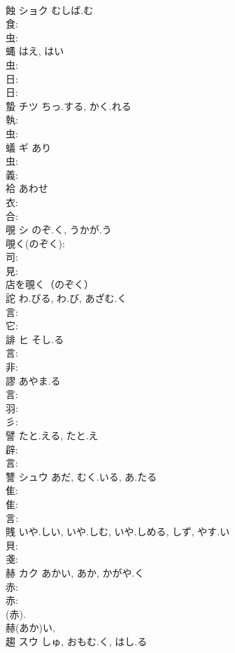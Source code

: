 \documentclass[8pt]{extreport}
\begin{document}
\begin{CJK}{UTF8}{min}
\\	蝕	ショク	むしば.む		
\\	食: 
\\	虫: 
\\	蝿		はえ, はい				
\\	虫: 
\\	日: 
\\	日: 
\\	蟄	チツ	ちっ.する, かく.れる		
\\	執: 
\\	虫: 
\\	蟻	ギ	あり		
\\	虫: 
\\	義: 
\\	袷		あわせ				
\\	衣: 
\\	合: 
\\	覗	シ	のぞ.く, うかが.う		
\\	覗く(のぞく): 
\\	司: 
\\	見: 
\\	店を覗く（のぞく） 
\\	詑		わ.びる, わ.び, あざむ.く				
\\	言: 
\\	它: 
\\	誹	ヒ	そし.る		
\\	言: 
\\	非: 
\\	謬		あやま.る				
\\	言: 
\\	羽: 
\\	彡: 
\\	譬		たと.える, たと.え				
\\	辟: 
\\	言: 
\\	讐	シュウ	あだ, むく.いる, あ.たる		
\\	隹: 
\\	隹: 
\\	言: 
\\	賎		いや.しい, いや.しむ, いや.しめる, しず, やす.い				
\\	貝: 
\\	戔: 
\\	赫	カク	あかい, あか, かがや.く		
\\	赤: 
\\	赤: 
\\	(赤). 
\\	赫(あか)い, 
\\	趨	スウ	しゅ, おもむ.く, はし.る		

\end{CJK}
\end{document}
